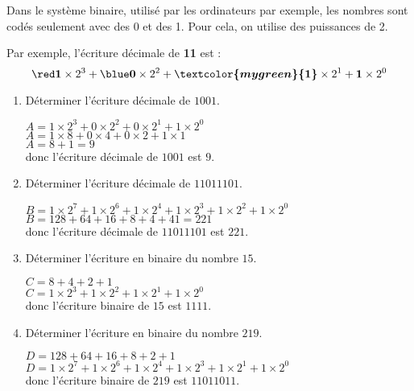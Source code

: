 \begin{corrige}
    Dans le système binaire, utilisé par les ordinateurs par exemple, les nombres sont codés seulement avec
    des 0 et des 1. Pour cela, on utilise des puissances de 2.

    Par exemple, l’écriture décimale de {\bfseries {}{}\textcolor{mygreen}{1}1} est :
    $$\boldsymbol{{\red 1}} \times 2^3 + \boldsymbol{{\blue 0}} \times 2^2 + \boldsymbol{{\textcolor{mygreen}{1}}} \times 2^1 + \boldsymbol{1} \times 2^0$$
    \begin{enumerate}
        \item Déterminer l’écriture décimale de $1001$.
        
        {\red
        $A= 1 \times 2^3 + 0 \times 2^2 + 0 \times 2^1 +  1\times 2^0$\\
        $A= 1 \times 8 + 0 \times 4 + 0 \times 2 +  1\times 1$\\
        $A= 8+1 = 9$\\
        donc l'écriture décimale de $1001$ est $9$.
        }
        \item Déterminer l’écriture décimale de $11011101$.
        
        {\red
        $B= 1 \times 2^7 + 1\times 2^6 + 1\times 2^4 + 1\times 2^3 + 1\times 2^2 + 1\times 2^0$\\
        $B= 128+64+16+8+4+41=221$\\
        donc l'écriture décimale de $11011101$ est $221$.        
        }
        \item Déterminer l’écriture en binaire du nombre $15$.
        
        {\red
        $C=8+4+2+1$\\
        $C=1\times 2^3 + 1\times 2^2 + 1\times 2^1 + 1\times 2^0$\\
        donc l'écriture binaire de $15$ est $1111$.
        }
        \item Déterminer l’écriture en binaire du nombre $219$.
        
        {\red
        $D=128+64+16+8+2+1$\\
        $D=1\times 2^7 + 1\times 2^6 + 1\times 2^4 + 1\times 2^3 + 1\times 2^1 + 1\times 2^0$\\
        donc l'écriture binaire de $219$ est $11011011$.
        }

    \end{enumerate}
\end{corrige}

